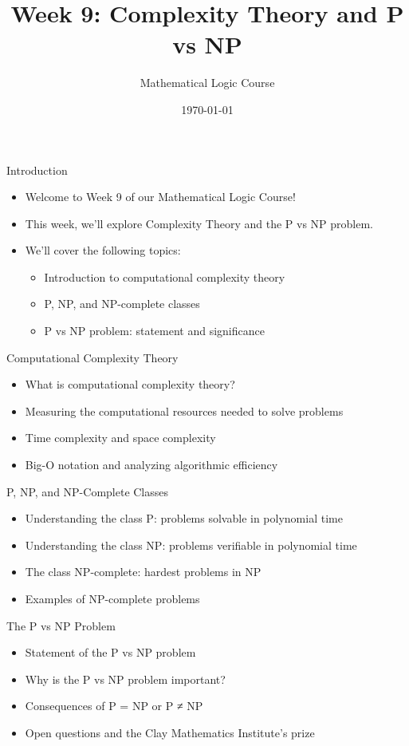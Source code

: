 \documentclass[presentation]{beamer}
\author{Mathematical Logic Course}
\date{\today}
\title{Week 9: Complexity Theory and P vs NP}
\begin{document}
\maketitle

\begin{frame}[label={sec:org97ba23e}]{Introduction}
\begin{itemize}
\item Welcome to Week 9 of our Mathematical Logic Course!
\item This week, we'll explore Complexity Theory and the P vs NP problem.
\item We'll cover the following topics:
\begin{itemize}
\item Introduction to computational complexity theory
\item P, NP, and NP-complete classes
\item P vs NP problem: statement and significance
\end{itemize}
\end{itemize}
\end{frame}

\begin{frame}[label={sec:org60bf753}]{Computational Complexity Theory}
\begin{itemize}
\item What is computational complexity theory?
\item Measuring the computational resources needed to solve problems
\item Time complexity and space complexity
\item Big-O notation and analyzing algorithmic efficiency
\end{itemize}
\end{frame}

\begin{frame}[label={sec:org1288f65}]{P, NP, and NP-Complete Classes}
\begin{itemize}
\item Understanding the class P: problems solvable in polynomial time
\item Understanding the class NP: problems verifiable in polynomial time
\item The class NP-complete: hardest problems in NP
\item Examples of NP-complete problems
\end{itemize}
\end{frame}

\begin{frame}[label={sec:org3b011bf}]{The P vs NP Problem}
\begin{itemize}
\item Statement of the P vs NP problem
\item Why is the P vs NP problem important?
\item Consequences of P = NP or P ≠ NP
\item Open questions and the Clay Mathematics Institute's prize
\end{itemize}
\end{frame}
\end{document}
